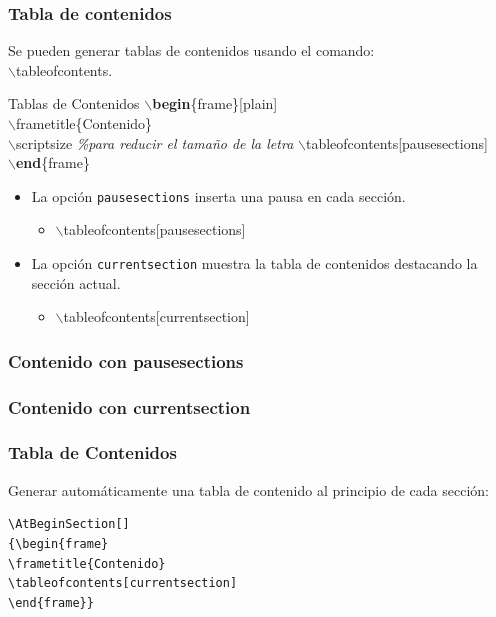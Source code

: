 \documentclass[aspectratio=43]{beamer}%
\newcommand\azul[1]{\textcolor[RGB]{19,15,204}{#1}}
\begin{document}
\begin{frame}[fragile]
\frametitle{\textbf{Tabla de contenidos}}
\justifying
 
 Se pueden generar tablas de contenidos usando el comando:\\ $\backslash$tableofcontents.
 \begin{exampleblock}{Tablas de Contenidos}
$\backslash$\textbf{begin}\{frame\}[plain]\\
$\backslash$frametitle\{Contenido\}\\
$\backslash$scriptsize \textit{\%para reducir el tama\~no de la letra}
$\backslash$\azul{tableofcontents}[pausesections]\\
$\backslash$\textbf{end}\{frame\}\\
\end{exampleblock}

\begin{itemize}\justifying
  \item La opción \texttt{pausesections} inserta una pausa en cada sección.
  \begin{itemize}\justifying
  \item []$\backslash$\azul{tableofcontents}[pausesections]
\end{itemize}

  \item La opción \texttt{currentsection} muestra la tabla de contenidos destacando la sección actual.
  \begin{itemize}\justifying
  \item []$\backslash$\azul{tableofcontents}[currentsection]\
\end{itemize}

\end{itemize}

 
\end{frame}

\begin{frame}[plain]
\frametitle{\textbf{Contenido con pausesections}}
\justifying
\scriptsize
 \tableofcontents[pausesections]
\end{frame}

\begin{frame}[plain]
\frametitle{\textbf{Contenido con currentsection}}
\justifying\scriptsize

 \tableofcontents[currentsection]
\end{frame}

\begin{frame}[fragile]
\frametitle{\textbf{Tabla de Contenidos}}
\justifying
 Generar automáticamente una tabla de contenido al principio de cada sección:
\begin{block}{}
   \lstset{language=TEX}%
   \vspace{-0.7cm}
\begin{lstlisting}
\AtBeginSection[]
{\begin{frame}
\frametitle{Contenido}
\tableofcontents[currentsection]
\end{frame}}
\end{lstlisting}\vspace{-0.3cm}
\end{block}

\end{frame}
\end{document}
